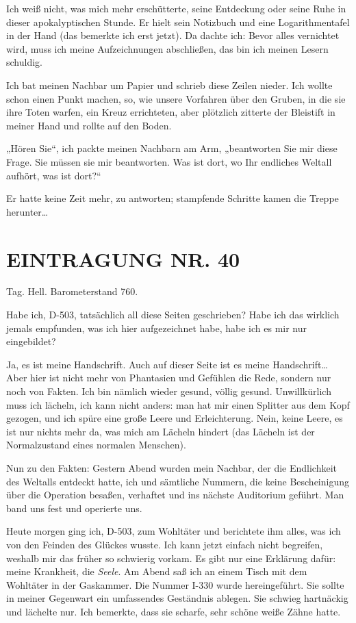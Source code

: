 Ich weiß nicht, was mich mehr erschütterte, seine Entdeckung oder
seine Ruhe in dieser apokalyptischen Stunde. Er hielt sein
Notizbuch und eine Logarithmentafel in der Hand (das bemerkte ich
erst jetzt). Da dachte ich: Bevor alles vernichtet wird, muss ich
meine Aufzeichnungen abschließen, das bin ich meinen Lesern
schuldig.

Ich bat meinen Nachbar um Papier und schrieb diese Zeilen
nieder. Ich wollte schon einen Punkt machen, so, wie unsere
Vorfahren über den Gruben, in die sie ihre Toten warfen, ein Kreuz
errichteten, aber plötzlich zitterte der Bleistift in meiner Hand
und rollte auf den Boden.

„Hören Sie“, ich packte meinen Nachbarn
am Arm, „beantworten Sie mir diese Frage. Sie müssen sie mir
beantworten. Was ist dort, wo Ihr endliches Weltall aufhört, was
ist dort?“

Er hatte keine Zeit mehr, zu antworten; stampfende Schritte kamen
die Treppe herunter\ldots{}

\section{EINTRAGUNG NR. 40}

Tag. Hell. Barometerstand 760.

Habe ich, D-503, tatsächlich all diese Seiten geschrieben? Habe ich
das wirklich jemals empfunden, was ich hier aufgezeichnet habe,
habe ich es mir nur eingebildet?

Ja, es ist meine Handschrift. Auch auf dieser Seite ist es meine
Handschrift\ldots{} Aber hier ist nicht mehr von Phantasien und Gefühlen
die Rede, sondern nur noch von Fakten. Ich bin nämlich wieder
gesund, völlig gesund. Unwillkürlich muss ich lächeln, ich kann
nicht anders: man hat mir einen Splitter aus dem Kopf gezogen, und
ich spüre eine große Leere und Erleichterung. Nein, keine Leere, es
ist nur nichts mehr da, was mich am Lächeln hindert (das Lächeln
ist der Normalzustand eines normalen Menschen).

Nun zu den Fakten: Gestern Abend wurden mein Nachbar, der die
Endlichkeit des Weltalls entdeckt hatte, ich und sämtliche Nummern,
die keine Bescheinigung über die Operation besaßen, verhaftet und
ins nächste Auditorium geführt. Man band uns fest und operierte
uns.

Heute morgen ging ich, D-503, zum Wohltäter und berichtete ihm
alles, was ich von den Feinden des Glückes wusste. Ich kann jetzt
einfach nicht begreifen, weshalb mir das früher so schwierig
vorkam. Es gibt nur eine Erklärung dafür: meine Krankheit, die
\emph{Seele}. Am Abend saß ich an einem Tisch mit dem Wohltäter in der
Gaskammer. Die Nummer I-330 wurde hereingeführt. Sie sollte in
meiner Gegenwart ein umfassendes Geständnis ablegen. Sie schwieg
hartnäckig und lächelte nur. Ich bemerkte, dass sie scharfe, sehr
schöne weiße Zähne hatte.

